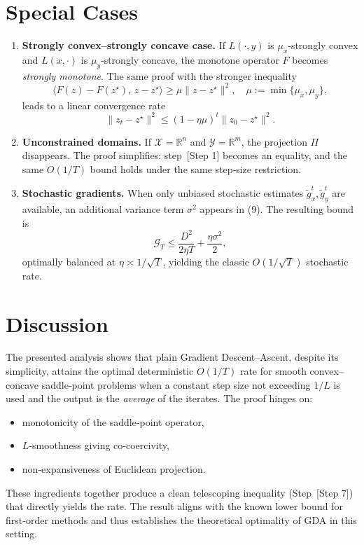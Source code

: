 \documentclass{article}
\begin{document}
\section*{Special Cases}
\begin{enumerate}[label=\alph*)]
\item \textbf{Strongly convex–strongly concave case.}  
If $L(\cdot ,y)$ is $\mu_{x}$‑strongly convex and $L(x,\cdot )$ is $\mu_{y}$‑strongly concave, the monotone operator $F$ becomes \emph{strongly monotone}. The same proof with the stronger inequality
\[
\langle F(z)-F(z^{\star}),\,z-z^{\star}\rangle\ge \mu\|z-z^{\star}\|^{2},
\quad \mu:=\min\{\mu_{x},\mu_{y}\},
\]
leads to a linear convergence rate
\[
\|z_{t}-z^{\star}\|^{2}\le (1-\eta\mu)^{t}\|z_{0}-z^{\star}\|^{2}.
\]

\item \textbf{Unconstrained domains.}  
If $\mathcal{X}=\mathbb{R}^{n}$ and $\mathcal{Y}=\mathbb{R}^{m}$, the projection $\Pi$ disappears. The proof simplifies: step~[Step 1] becomes an equality, and the same $O(1/T)$ bound holds under the same step‑size restriction.

\item \textbf{Stochastic gradients.}  
When only unbiased stochastic estimates $\tilde g_{x}^{t},\tilde g_{y}^{t}$ are available, an additional variance term $\sigma^{2}$ appears in (9). The resulting bound is
\[
\mathcal{G}_{T}\le \frac{D^{2}}{2\eta T}+ \frac{\eta\sigma^{2}}{2},
\]
optimally balanced at $\eta\asymp 1/\sqrt{T}$, yielding the classic $O(1/\sqrt{T})$ stochastic rate.

\end{enumerate}

\section*{Discussion}
The presented analysis shows that plain Gradient Descent–Ascent, despite its simplicity, attains the optimal deterministic $O(1/T)$ rate for smooth convex–concave saddle‑point problems when a constant step size not exceeding $1/L$ is used and the output is the \emph{average} of the iterates. The proof hinges on:
\begin{itemize}
\item monotonicity of the saddle‑point operator,
\item $L$‑smoothness giving co‑coercivity,
\item non‑expansiveness of Euclidean projection.
\end{itemize}
These ingredients together produce a clean telescoping inequality (Step~[Step 7]) that directly yields the rate. The result aligns with the known lower bound for first‑order methods and thus establishes the theoretical optimality of GDA in this setting.
\end{document}
